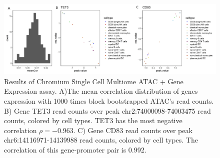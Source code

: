 \documentclass{article}
\begin{document}
\begin{figure}[htbp]
\centering
\includegraphics[scale=0.08]{Figures/sfig2.jpeg}
\caption{Results of Chromium Single Cell Multiome ATAC + Gene Expression assay. A)The mean correlation distribution of genes expression with 1000 times block bootstrapped ATAC's read counts. B) Gene TET3 read counts over peak chr2:74000098-74003475 read counts, colored by cell types. TET3 has the most negative correlation $\rho = −0.963$. C) Gene CD83 read counts over peak chr6:14116971-14139988 read counts, colored by cell types. The correlation of this gene-promoter pair is 0.992.} 
\label{fig:suppfig3}
\end{figure}


%
%
%
%
%
%
%

\end{document}
